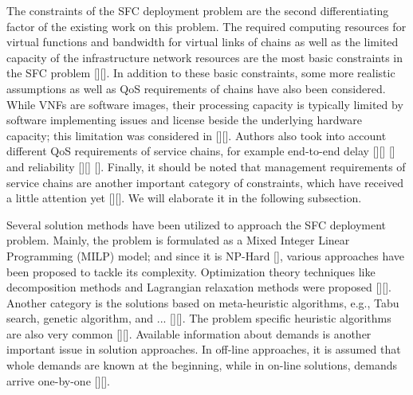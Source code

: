 The constraints of the SFC deployment problem are the second differentiating factor of the existing work on this problem. The required computing resources for virtual functions and bandwidth for virtual links of chains as well as the limited capacity of the infrastructure network resources are the most basic constraints in the SFC problem [][]. In addition to these basic constraints, some more realistic assumptions as well as QoS requirements of chains have also been considered. While VNFs are software images, their processing capacity is typically limited by software implementing issues and license beside the underlying hardware capacity; this  limitation was considered in [][]. Authors also took into account different QoS requirements of service chains, for example end-to-end delay [][] [] and reliability [][] []. Finally, it should be noted that management requirements of service chains are another important category of constraints, which have received a little attention yet [][]. We will elaborate it in the following subsection.

Several solution methods have been utilized to approach the SFC deployment problem. Mainly, the problem is formulated as a Mixed Integer Linear Programming (MILP) model; and since it is NP-Hard [], various approaches have been proposed to tackle its complexity. Optimization theory techniques like decomposition methods and Lagrangian relaxation methods were proposed [][]. Another category is the solutions based on meta-heuristic algorithms, e.g., Tabu search, genetic algorithm, and ... [][]. The problem specific heuristic algorithms are also very common [][]. Available information about demands is another important issue in solution approaches. In off-line approaches, it is assumed that whole demands are known at the beginning, while in on-line solutions, demands arrive one-by-one [][].


